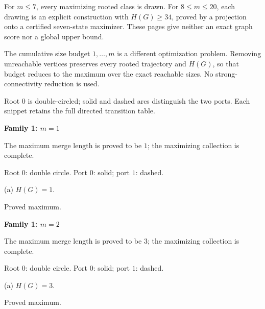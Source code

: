 \documentclass[10pt,a4paper]{article}
\begin{document}
For $m\le7$, every maximizing rooted class is drawn. For $8\le m\le20$, each drawing is an explicit construction with $H(G)\ge34$, proved by a projection onto a certified seven-state maximizer. These pages give neither an exact graph score nor a global upper bound.\par\vspace{2mm}
The cumulative size budget $1,\ldots,m$ is a different optimization problem. Removing unreachable vertices preserves every rooted trajectory and $H(G)$, so that budget reduces to the maximum over the exact reachable sizes. No strong-connectivity reduction is used.\par\vspace{2mm}
Root $0$ is double-circled; solid and dashed arcs distinguish the two ports. Each snippet retains the full directed transition table.\par
\clearpage
{\Large\bfseries Family 1: $m=1$}\par
\vspace{2mm}
{\small The maximum merge length is proved to be $1$; the maximizing collection is complete.}\par
\vspace{1mm}
{\small Root $0$: double circle. Port $0$: solid; port $1$: dashed.}\par
\vspace{3mm}
\noindent\hfill
\begin{minipage}[t]{.96\textwidth}\centering
\resizebox{9cm}{!}{}\par
{\footnotesize (a) $H(G)=1$.\par Proved maximum.}\par
\end{minipage}\hfill
\par\vspace{2.5mm}
\clearpage
{\Large\bfseries Family 1: $m=2$}\par
\vspace{2mm}
{\small The maximum merge length is proved to be $3$; the maximizing collection is complete.}\par
\vspace{1mm}
{\small Root $0$: double circle. Port $0$: solid; port $1$: dashed.}\par
\vspace{3mm}
\noindent\hfill
\begin{minipage}[t]{.96\textwidth}\centering
\resizebox{9cm}{!}{}\par
{\footnotesize (a) $H(G)=3$.\par Proved maximum.}\par
\end{minipage}\hfill
\end{document}
